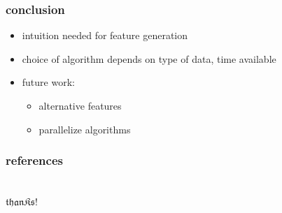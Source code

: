 \begin{frame}
\frametitle{conclusion}

	\begin{itemize}
		\setlength{\itemindent}{2em}
		\item intuition needed for feature generation
		\item choice of algorithm depends on type of data, time available
		\item future work:
		\begin{itemize}
			\setlength{\itemindent}{3em}
			\item alternative features
			\item parallelize algorithms
		\end{itemize}
	\end{itemize}

\end{frame}

\begin{frame}%

	\frametitle{references}
	
	

\end{frame}

\begingroup
{}
\begin{frame}[plain]

	\frametitle{}
	\centering\Huge\color{Red}
	\vfill
	~\\
	$\mathfrak{thanKs!}$
	\vfill

\end{frame}
\endgroup